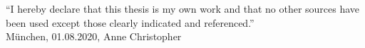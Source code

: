 \documentclass[12pt,a4paper,twoside]{report}
\begin{document}
\vspace*{150mm}
“I hereby declare that this thesis is my own work and that no other sources have been used except those clearly indicated and referenced.”
\\[15mm]
M\"unchen, 01.08.2020, Anne Christopher

\bigskip
\newpage

\newpage

\newpage
\pagestyle{empty}
\tableofcontents
\newpage
\pagestyle{plain}





\renewcommand\bibname{References}


\end{document}
